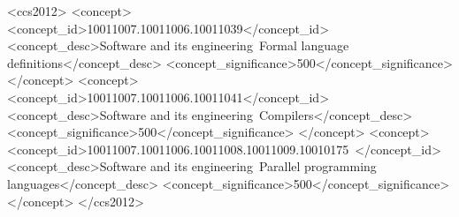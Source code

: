 \documentclass[acmsmall,acmthm=false,nonacm]{acmart}
\theoremstyle{straighttext0}
\theoremstyle{straighttext}
\begin{document}
\author{Chaitanya Koparkar}\iuaffil{}
\author{Mike Rainey}\cmuaffil{}
\author{Michael Vollmer}\kentaffil{}
\author{Milind Kulkarni}\purdueaffil{}
\author{Ryan R. Newton}\purdueaffil{}


\begin{abstract}
Recent work showed that compiling functional programs to use dense, serialized
memory representations for recursive algebraic datatypes can yield significant
constant-factor speedups for sequential programs. 
But serializing data in a
{\em maximally} dense format consequently serializes the processing of that
data, yielding a tension between density and parallelism.  
%
This paper shows that a disciplined, practical compromise is possible.
%
We present \pargibbon{}, a
compiler that obtains the benefits of dense data formats {\em and} parallelism.
%
We formalize the semantics of the {\em parallel location calculus}
underpinning this novel implementation strategy, 
and show that it is type-safe.
%
\pargibbon{} exceeds the parallel performance of existing compilers for purely
functional programs that use recursive algebraic datatypes,
including, notably, abstract-syntax-tree traversals as in compilers.
\end{abstract}


\begin{CCSXML}
  <ccs2012>
    <concept>
      <concept_id>10011007.10011006.10011039</concept_id>
      <concept_desc>Software and its engineering~Formal language definitions</concept_desc>
      <concept_significance>500</concept_significance>
    </concept>
    <concept>
      <concept_id>10011007.10011006.10011041</concept_id>
      <concept_desc>Software and its engineering~Compilers</concept_desc>
      <concept_significance>500</concept_significance>
    </concept>
    <concept>
      <concept_id>10011007.10011006.10011008.10011009.10010175~</concept_id>
      <concept_desc>Software and its engineering~Parallel programming languages</concept_desc>
      <concept_significance>500</concept_significance>
    </concept>
  </ccs2012>
\end{CCSXML}

\end{document}
